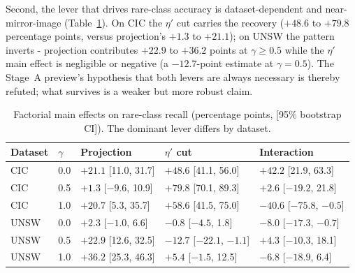 \documentclass[11pt,a4paper]{report}
\begin{document}
Second, the lever that drives rare-class accuracy is dataset-dependent and
near-mirror-image (Table~\ref{tab:factorial}). On CIC the $\eta'$ cut
carries the recovery ($+48.6$ to $+79.8$ percentage points, versus
projection's $+1.3$ to $+21.1$); on UNSW the pattern inverts - projection
contributes $+22.9$ to $+36.2$ points at $\gamma \geq 0.5$ while the
$\eta'$ main effect is negligible or negative (a $-12.7$-point estimate at
$\gamma = 0.5$). The Stage~A preview's hypothesis that both levers are
always necessary is thereby refuted; what survives is a weaker but more
robust claim.

\begin{table}[htbp]
  \centering
  \caption{Factorial main effects on rare-class recall (percentage points,
  [95\% bootstrap CI]). The dominant lever differs by dataset.}
  \label{tab:factorial}
  \footnotesize
  \begin{tabular}{@{}lllll@{}}
    \toprule
    Dataset & $\gamma$ & Projection & $\eta'$ cut & Interaction \\
    \midrule
    CIC  & 0.0 & $+21.1$ [11.0, 31.7]  & $+48.6$ [41.1, 56.0]  & $+42.2$ [21.9, 63.3] \\
    CIC  & 0.5 & $+1.3$ [$-9.6$, 10.9] & $+79.8$ [70.1, 89.3]  & $+2.6$ [$-19.2$, 21.8] \\
    CIC  & 1.0 & $+20.7$ [5.3, 35.7]   & $+58.6$ [41.5, 75.0]  & $-40.6$ [$-75.8$, $-0.5$] \\
    UNSW & 0.0 & $+2.3$ [$-1.0$, 6.6]  & $-0.8$ [$-4.5$, 1.8]  & $-8.0$ [$-17.3$, $-0.7$] \\
    UNSW & 0.5 & $+22.9$ [12.6, 32.5]  & $-12.7$ [$-22.1$, $-1.1$] & $+4.3$ [$-10.3$, 18.1] \\
    UNSW & 1.0 & $+36.2$ [25.3, 46.3]  & $+5.4$ [$-1.5$, 12.5] & $-6.8$ [$-18.9$, 6.4] \\
    \bottomrule
  \end{tabular}
\end{table}
\end{document}
